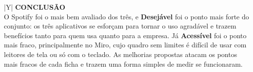 \documentclass[10pt,a4paper]{article}
\begin{document}
{\small\renewcommand{\arraystretch}{1.22}%
\noindent
\begin{tabularx}{\linewidth}{|Y|}
\hline
{}\textcolor{navytext}{\bfseries\footnotesize CONCLUSÃO} \\ \hline
O Spotify foi o mais bem avaliado dos três, e \textbf{Desejável} foi o ponto mais forte do conjunto: os três aplicativos se esforçam para tornar o uso agradável e trazem benefícios tanto para quem usa quanto para a empresa. Já \textbf{Acessível} foi o ponto mais fraco, principalmente no Miro, cujo quadro sem limites é difícil de usar com leitores de tela ou só com o teclado. As melhorias propostas atacam os pontos mais fracos de cada ficha e trazem uma forma simples de medir se funcionaram. \\ \hline
\end{tabularx}\par}
\end{document}
